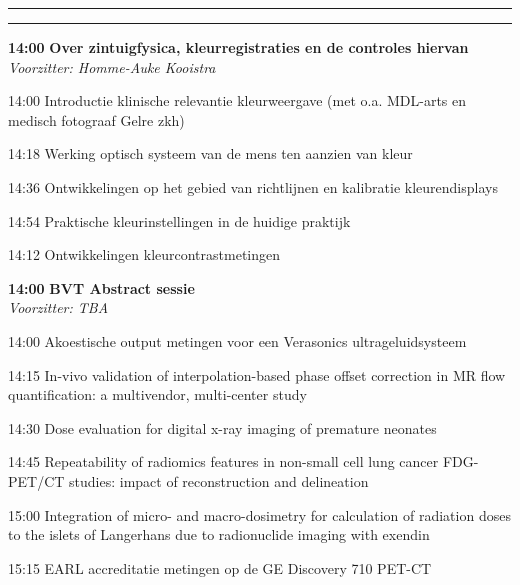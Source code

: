 \documentclass[a4paper,10pt]{report}
\begin{document}
\begin{multicols*}{3}

\hrule \vspace{0mm}
\hrule\strut
\vfill

\begin{packed_enum}
\item[\textbf{14:00}] \textbf{Over zintuigfysica, kleurregistraties en de controles hiervan}\\\textit{Voorzitter: Homme-Auke Kooistra}
\item[14:00] Introductie klinische relevantie kleurweergave (met o.a. MDL-arts en medisch fotograaf Gelre zkh)
\item[14:18] Werking optisch systeem van de mens ten aanzien van kleur
\item[14:36] Ontwikkelingen op het gebied van richtlijnen en kalibratie kleurendisplays
\item[14:54] Praktische kleurinstellingen in de huidige praktijk
\item[14:12] Ontwikkelingen kleurcontrastmetingen
\end{packed_enum} %


\begin{packed_enum}
\item[\textbf{14:00}]\textbf{BVT Abstract sessie}\\\textit{Voorzitter: TBA}
\item[14:00] Akoestische output metingen voor een Verasonics ultrageluidsysteem
\item[14:15] In-vivo validation of interpolation-based phase offset cor\-rection in MR flow quantification: a multivendor, multi-center study
\item[14:30] Dose eval\-uation for digital x-ray imaging of premature neonates
\item[14:45] Repeatability of radiomics features in non-small cell lung cancer FDG-PET/CT studies: impact of reconstruction and delineation
\item[15:00] Integration of micro- and macro-dosimetry for calculation of radiation doses to the islets of Langerhans due to radionuclide imaging with exendin
\item[15:15] EARL accreditatie metingen op de GE Discovery 710 PET-CT
\end{packed_enum} %
 

\end{multicols*}
\end{document}
